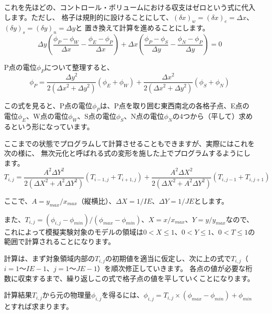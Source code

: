 \documentclass[uplatex,a4paper,11pt,oneside,openany]{jsbook}
\begin{document}
これを先ほどの、コントロール・ボリュームにおける収支はゼロという式に代入します。ただし、
格子は規則的に設けることにして、$(\delta x)_{w}=(\delta x)_{e}=\varDelta x$、$(\delta y)_{s}=(\delta y)_{n}=\varDelta y$と
置き換えて計算を進めることにします。
\begin{equation*}
  \varDelta y(\frac{\phi_{P}-\phi_{W}}{\varDelta x}-\frac{\phi_{E}-\phi_{P}}{\varDelta x})+\varDelta x(\frac{\phi_{P}-\phi_{S}}{\varDelta y}-\frac{\phi_{N}-\phi_{P}}{\varDelta y})=0
\end{equation*}

P点の電位$\phi_{P}$について整理すると、
\begin{equation*}
  \phi_{P}=\frac{{\varDelta y}^2}{2({\varDelta x}^2+{\varDelta y}^2)}(\phi_{E}+\phi_{W})+
  \frac{{\varDelta x}^2}{2({\varDelta x}^2+{\varDelta y}^2)}(\phi_{S}+\phi_{N})
\end{equation*}

この式を見ると、P点の電位$\phi_{P}$は、P点を取り囲む東西南北の各格子点、E点の電位$\phi_{E}$、W点の電位$\phi_{W}$、S点の電位$\phi_{S}$、N点の電位$\phi_{N}$の4つから（平して）求めるという形になっています。

ここまでの状態でプログラムして計算させることもできますが、実際にはこれを次の様に、
無次元化と呼ばれる式の変形を施した上でプログラムするようにします。
\begin{equation*}
  T_{i,j} = \frac{A^2 {\varDelta Y}^2}{2({\varDelta X}^2+A^2 {\varDelta Y}^2)} (T_{i-1,j}+T_{i+1,j})+
          \frac{A^2 {\varDelta X}^2}{2({\varDelta X}^2+A^2 {\varDelta Y}^2)}(T_{i,j-1}+T_{i,j+1})
\end{equation*}

ここで、$A=y_{max}/x_{max}$（縦横比）、$\varDelta X=1/IE$、$\varDelta Y=1/JE$とします。

また、$T_{i,j}=(\phi_{i,j}-\phi_{min})/(\phi_{max}-\phi_{min})$、$X=x/x_{max}$、$Y=y/y_{max}$なので、
これによって模擬実験対象のモデルの領域は$0<X\le1$、$0<Y\le1$、$0<T\le1$の範囲で計算されることになります。

計算は、まず対象領域内部の$T_{i,j}$の初期値を適当に仮定し、次に上の式で$T_{i,j}$（$i=1〜IE-1$、$j=1〜JE-1$）を順次修正していきます。
各点の値が必要な桁数に収束するまで、繰り返しこの式で格子点の値を平していくことになります。

計算結果$T_{i,j}$から元の物理量$\phi_{i,j}$を得るには、$\phi_{i,j}=T_{i,j}\times(\phi_{max}-\phi_{min})+\phi_{min}$とすれば求まります。


\end{document}
